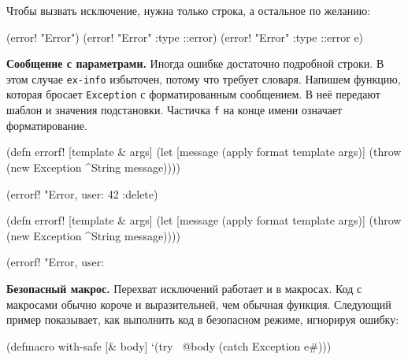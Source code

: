 \fi

\noindent
Чтобы вызвать исключение, нужна только строка, а остальное по желанию:

\begin{english}
  \begin{clojure}
(error! "Error")
(error! "Error" {:type ::error})
(error! "Error" {:type ::error} e)
  \end{clojure}
\end{english}

\textbf{Сообщение с параметрами.} Иногда ошибке достаточно подробной строки. В
этом случае \verb|ex-info| избыточен, потому что требует словаря. Напишем
функцию, которая бросает \verb|Exception| с форматированным сообщением. В
неё передают шаблон и значения подстановки. Частичка \verb|f| на конце
имени означает форматирование.


\ifx\DEVICETYPE\MOBILE

\begin{english}
  \begin{clojure}
(defn errorf! [template & args]
  (let [message (apply format
                  template args)]
    (throw (new Exception
             ^String message))))

(errorf! "Error, user: %
  42 :delete)
  \end{clojure}
\end{english}

\else

\begin{english}
  \begin{clojure}
(defn errorf! [template & args]
  (let [message (apply format template args)]
    (throw (new Exception ^String message))))

(errorf! "Error, user: %
  \end{clojure}
\end{english}

\fi

\textbf{Безопасный макрос.} Перехват исключений работает и в макросах. Код с
макросами обычно короче и выразительней, чем обычная функция. Следующий пример
показывает, как выполнить код в безопасном режиме, игнорируя ошибку:


\begin{english}
  \begin{clojure}
(defmacro with-safe [& body]
  `(try
     ~@body
     (catch Exception e#)))
  \end{clojure}
\end{english}

